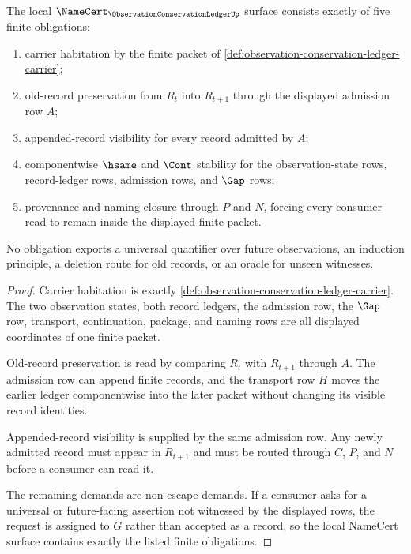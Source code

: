 \begin{theorem}
\label{thm:observation-conservation-ledger-namecert-obligations}
The local $\NameCert_{\ObservationConservationLedgerUp}$ surface consists exactly of five finite obligations:
\begin{enumerate}
\item carrier habitation by the finite packet of \autoref{def:observation-conservation-ledger-carrier};
\item old-record preservation from $R_t$ into $R_{t+1}$ through the displayed admission row $A$;
\item appended-record visibility for every record admitted by $A$;
\item componentwise $\hsame$ and $\Cont$ stability for the observation-state rows, record-ledger rows, admission rows, and $\Gap$ rows;
\item provenance and naming closure through $P$ and $N$, forcing every consumer read to remain inside the displayed finite packet.
\end{enumerate}
No obligation exports a universal quantifier over future observations, an induction principle, a deletion route for old records, or an oracle for unseen witnesses.
\end{theorem}
\begin{proof}
Carrier habitation is exactly \autoref{def:observation-conservation-ledger-carrier}. The two observation states, both record ledgers, the admission row, the $\Gap$ row, transport, continuation, package, and naming rows are all displayed coordinates of one finite packet.

Old-record preservation is read by comparing $R_t$ with $R_{t+1}$ through $A$. The admission row can append finite records, and the transport row $H$ moves the earlier ledger componentwise into the later packet without changing its visible record identities.

Appended-record visibility is supplied by the same admission row. Any newly admitted record must appear in $R_{t+1}$ and must be routed through $C$, $P$, and $N$ before a consumer can read it.

The remaining demands are non-escape demands. If a consumer asks for a universal or future-facing assertion not witnessed by the displayed rows, the request is assigned to $G$ rather than accepted as a record, so the local NameCert surface contains exactly the listed finite obligations.
\end{proof}

